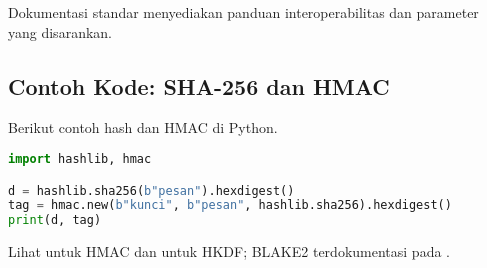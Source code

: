 \documentclass[../main.tex]{subfiles}
\begin{document}
Dokumentasi standar menyediakan panduan interoperabilitas dan parameter yang disarankan.

\subsection{Contoh Kode: SHA-256 dan HMAC}
Berikut contoh hash dan HMAC di Python.

\begin{lstlisting}[language=Python, caption={SHA-256 dan HMAC}, label={lst:hash-hmac}]
import hashlib, hmac

d = hashlib.sha256(b"pesan").hexdigest()
tag = hmac.new(b"kunci", b"pesan", hashlib.sha256).hexdigest()
print(d, tag)
\end{lstlisting}

\noindent Lihat \textcite{rfc2104} untuk HMAC dan \textcite{rfc5869} untuk HKDF; BLAKE2 terdokumentasi pada \textcite{rfc7693}.
\end{document}
